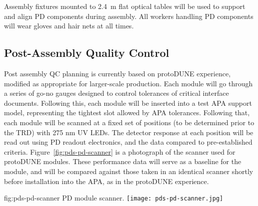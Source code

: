 Assembly fixtures mounted to 2.4~m flat optical tables will be used to support and align PD components during assembly.  All workers handling PD components will wear gloves and hair nets at all times.






\subsection{Post-Assembly Quality Control}

Post assembly QC planning is currently based on protoDUNE experience, modified as appropriate for larger-scale production.  Each module will go through a series of go-no gauges designed to control tolerances of critical interface documents.  Following this, each module will be inserted into a test APA support model, representing the tightest slot allowed by APA tolerances.  Following that, each module will be scanned at a fixed set of positions (to be determined prior to the TRD) with 275 nm UV LEDs.  The detector response at each position will be read out using PD readout electronics, and the data compared to pre-established criteria.  Figure~\ref{fig:pds-pd-scanner} is a photograph of the scanner used for protoDUNE modules. These performance data will serve as a baseline for the module, and will be compared against those taken in an identical scanner shortly before installation into the APA, as in the protoDUNE experience. 

\begin{dunefigure}{fig:pds-pd-scanner}
{PD module scanner.}
  \texttt{[image: pds-pd-scanner.jpg]}
\end{dunefigure}

